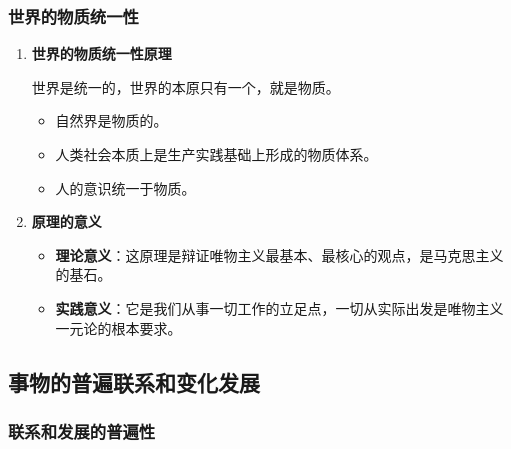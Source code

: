 \documentclass[12pt, a4paper, oneside]{ctexart}
\begin{document}
\subsubsection{世界的物质统一性}

\begin{enumerate}
  \item {\bf 世界的物质统一性原理}
  
  世界是统一的，世界的本原只有一个，就是物质。
  \begin{itemize}
    \item 自然界是物质的。
    \item 人类社会本质上是生产实践基础上形成的物质体系。
    \item 人的意识统一于物质。
  \end{itemize}
  \item {\bf 原理的意义}
  
  \begin{itemize}
    \item {\bf 理论意义}：这原理是辩证唯物主义最基本、最核心的观点，是马克思主义的基石。
    \item {\bf 实践意义}：它是我们从事一切工作的立足点，一切从实际出发是唯物主义一元论的根本要求。
  \end{itemize}

\end{enumerate}

\subsection{事物的普遍联系和变化发展}

\subsubsection{联系和发展的普遍性}
\end{document}
